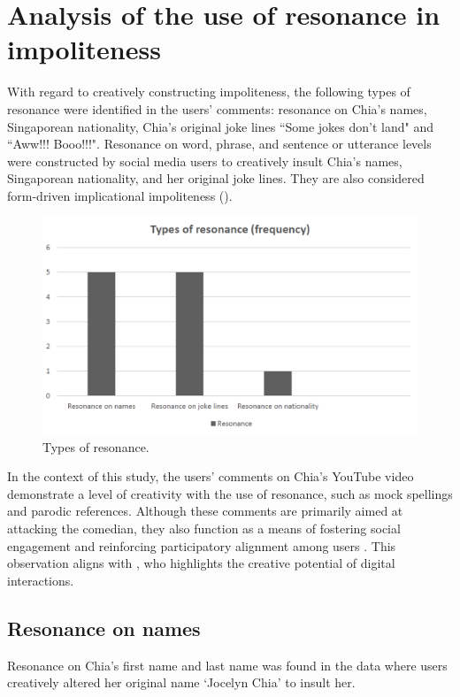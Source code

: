 \documentclass[english]{textolivre}
\begin{document}
\section{Analysis of the use of resonance in impoliteness}
With regard to creatively constructing impoliteness, the following types of resonance were identified in the users’ comments: resonance on Chia’s names, Singaporean nationality, Chia’s original joke lines ``Some jokes don’t land" and ``Aww!!! Booo!!!". Resonance on word, phrase, and sentence or utterance levels were constructed by social media users to creatively insult Chia’s names, Singaporean nationality, and her original joke lines. They are also considered form-driven implicational impoliteness ().

\begin{figure}[h!]
    \centering
    \begin{minipage}{0.85\linewidth}
    \includegraphics[width=\linewidth]{imagens/figura8.png}
    \caption{Types of resonance.}\label{fig-3}
    \end{minipage}
\end{figure}

In the context of this study, the users’ comments on Chia’s YouTube video demonstrate a level of creativity with the use of resonance, such as mock spellings and parodic references. Although these comments are primarily aimed at attacking the comedian, they also function as a means of fostering social engagement and reinforcing participatory alignment among users \cite{xie2018}. This observation aligns with \textcite{oliveira2025}, who highlights the creative potential of digital interactions.

\subsection{Resonance on names}
Resonance on Chia’s first name and last name was found in the data where users creatively altered her original name ‘Jocelyn Chia’ to insult her.
\end{document}
